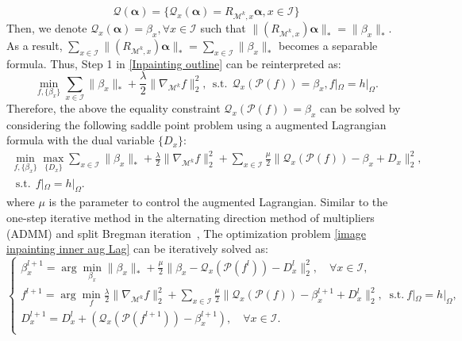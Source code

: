 \documentclass[letterpaper,10pt]{article}
\begin{document}
 \begin{equation}\label{duplicate operator}
\mathcal{Q} (\bm{\alpha}) = \{ \mathcal{Q}_x (\bm{\alpha}) = R_{\mathcal{M}^k,x} \bm{\alpha}, x \in \mathscr{I} \}
\end{equation}
Then, we denote $\mathcal{Q}_x (\bm{\alpha})= \beta_x, \forall x \in \mathscr{I}$ such that $\|(R_{\mathcal{M}^k,x}) \bm{\alpha} \|_* =  \| {\beta}_x \|_*$. As a result, $\sum_{x \in \mathscr{I}} \|(R_{\mathcal{M}^k,x}) \bm{\alpha} \|_* = \sum_{x \in \mathscr{I}} \|{\beta}_x\|_*$ becomes a separable formula. Thus, Step 1 in \eqref{Inpainting outline} can be reinterpreted as:
\begin{equation}\label{image inpainting inner}
\min_{f,\{\beta_x\}} \sum_{x \in \mathscr{I}} \|{\beta}_x\|_* +\frac{\lambda}{2}\|\nabla_{\mathcal{M}^k} f\|_2^2, ~~ \text{s.t.} ~~\mathcal{Q}_x (\mathcal{P}(f))  = {\beta}_x,f|_\Omega = h|_\Omega.
\end{equation}
Therefore, the above the equality constraint $ \mathcal{Q}_x (\mathcal{P}(f))  = {\beta}_x$ can be solved by considering the following saddle point problem using a augmented Lagrangian formula with the dual variable $\{D_{x}\}$:
\begin{equation}\label{image inpainting inner aug Lag}
\begin{split}
\min_{f,\{\beta_x\}}\max_{\{D_x\}} \sum_{x \in \mathscr{I}} \|{\beta}_x\|_* +\frac{\lambda}{2}\|\nabla_{\mathcal{M}^k} f\|_2^2   + \sum_{x \in \mathscr{I}} \frac{\mu}{2} \|\mathcal{Q}_x (\mathcal{P} (f)) - {\beta}_x + D_{x}\|_2^2, \\
~~ \text{s.t.} ~~  f|_\Omega = h|_\Omega.
\end{split}
\end{equation}
where $\mu$ is the parameter to control the augmented Lagrangian. Similar to the one-step iterative method in the alternating direction method of multipliers (ADMM)
and split Bregman iteration~\cite{glowinski1989augmented, goldstein2009split}, The optimization problem \eqref{image inpainting inner aug Lag} can be iteratively solved as:
\begin{equation}\label{image inpainting inner iteration scheme}
\begin{cases}
\displaystyle \beta_x^{l+1} = \arg\min_{\beta_x}  \|\beta_x\|_* +\frac{\mu}{2}\|{\beta_x} - \mathcal{Q}_x (\mathcal{P}(f^{l})) -D_{x}^{l}\|_2^2, \quad \forall x \in \mathscr{I},\\
\displaystyle f^{l+1} = \arg\min_f \frac{\lambda}{2}\|\nabla_{\mathcal{M}^k} f\|_2^2 +  \sum\limits_{x \in \mathscr{I}} \frac{\mu}{2} \|\mathcal{Q}_x (\mathcal{P} (f)) - {\beta}_x^{l+1}+ D_x^l\|_2^2, ~\text{ s.t.}~  f|_\Omega = h|_\Omega,\\
D_{x}^{l+1} = D_{x}^{l} + (\mathcal{Q}_x(\mathcal{P}(f^{l+1}))-\beta_x^{l+1}), \quad \forall x \in \mathscr{I}.\\
\end{cases}
\end{equation}
\end{document}
